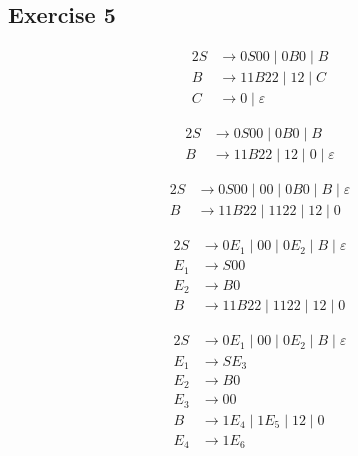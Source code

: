 {\subsection{Exercise 5}
\begin{center}
\begin{minipage}[c]{0.3\textwidth} \begin{alignat*}{2}
	S &\rightarrow 0S00\mid 0B0\mid B\\
	B &\rightarrow 11B22\mid 12\mid C\\
	C &\rightarrow 0\mid \varepsilon
\end{alignat*} \end{minipage}%
\begin{minipage}[c]{0.3\textwidth} \begin{alignat*}{2}
	S &\rightarrow 0S00\mid 0B0\mid B\\
	B &\rightarrow 11B22\mid 12\mid 0\mid \varepsilon
\end{alignat*} \end{minipage}%
\begin{minipage}[c]{0.4\textwidth} \begin{alignat*}{2}
	S &\rightarrow 0S00\mid 00\mid 0B0\mid B\mid \varepsilon\\
	B &\rightarrow 11B22\mid 1122\mid 12\mid 0
\end{alignat*} \end{minipage}
\end{center}
\begin{center}
\begin{minipage}[c]{0.3\textwidth} \begin{alignat*}{2}
	S &\rightarrow 0E_1\mid 00\mid 0E_2\mid B\mid \varepsilon\\
	E_1 &\rightarrow S00\\
	E_2 &\rightarrow B0\\
	B &\rightarrow 11B22\mid 1122\mid 12\mid 0
\end{alignat*} \end{minipage}%
\begin{minipage}[c]{0.3\textwidth} \begin{alignat*}{2}
	S &\rightarrow 0E_1\mid 00\mid 0E_2\mid B\mid \varepsilon\\
	E_1 &\rightarrow SE_3\\
	E_2 &\rightarrow B0\\
	E_3 &\rightarrow 00\\
	B &\rightarrow 1E_4\mid 1E_5\mid 12\mid 0\\
	E_4 &\rightarrow 1E_6\\

\end{alignat*}
\end{minipage}
\end{center}}
